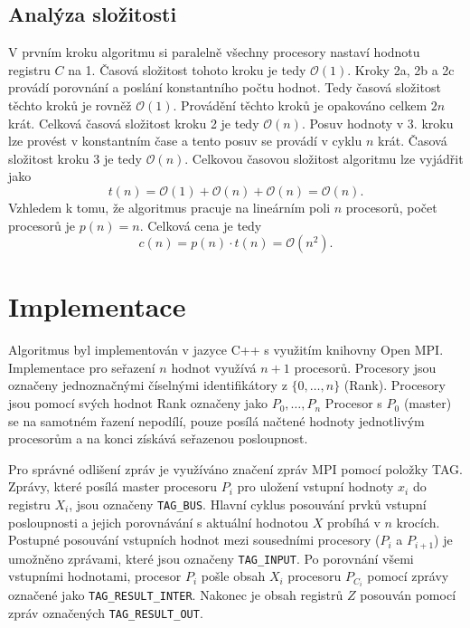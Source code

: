 \documentclass[a4paper,12pt]{article}
\begin{document}
\subsection*{Analýza složitosti}
V prvním kroku algoritmu si paralelně všechny procesory nastaví hodnotu registru $C$ na 1. Časová složitost 
tohoto kroku je tedy $\mathcal{O}(1)$. Kroky 2a, 2b a 2c provádí porovnání a poslání konstantního 
počtu hodnot. Tedy časová složitost těchto kroků je rovněž $\mathcal{O}(1)$. Provádění těchto kroků 
je opakováno celkem $2n$ krát. Celková časová složitost kroku 2 je tedy $\mathcal{O}(n)$. Posuv hodnoty v 3. 
kroku lze provést v konstantním čase a tento posuv se provádí v cyklu $n$ krát. Časová složitost kroku 
3 je tedy $\mathcal{O}(n)$. Celkovou časovou složitost algoritmu lze vyjádřit jako
\begin{equation}
  t(n) = \mathcal{O}(1) + \mathcal{O}(n) + \mathcal{O}(n) = \mathcal{O}(n).
\end{equation}
Vzhledem k tomu, že algoritmus pracuje na lineárním poli $n$ procesorů, počet procesorů 
je $p(n) = n$. Celková cena je tedy
\begin{equation}
  c(n) = p(n)\cdot t(n) = \mathcal{O}(n^2).
\end{equation}

\section{Implementace}
Algoritmus byl implementován v jazyce C++ s využitím knihovny Open MPI. Implementace pro seřazení $n$ hodnot 
využívá $n+1$ procesorů. Procesory jsou označeny jednoznačnými číselnými identifikátory z $\{0,\dots,n\}$ 
(Rank). Procesory jsou pomocí svých hodnot Rank označeny jako $P_0, \dots, P_n$ Procesor s $P_0$ (master) se na samotném řazení 
nepodílí, pouze posílá načtené hodnoty jednotlivým procesorům a na konci získává seřazenou posloupnost.

Pro správné odlišení zpráv je využíváno značení zpráv MPI pomocí položky TAG. Zprávy, které posílá master procesoru $P_i$ pro 
uložení vstupní hodnoty $x_i$ do registru $X_i$, jsou označeny \texttt{TAG\_BUS}. 
Hlavní cyklus posouvání prvků vstupní posloupnosti a jejich porovnávání s aktuální hodnotou $X$ probíhá v 
$n$ krocích. Postupné posouvání vstupních hodnot mezi sousedními procesory ($P_i$ a $P_{i+1}$) je umožněno 
zprávami, které jsou označeny \texttt{TAG\_INPUT}. Po porovnání všemi vstupními hodnotami, procesor $P_i$
pošle obsah $X_i$ procesoru $P_{C_i}$ pomocí zprávy označené jako \texttt{TAG\_RESULT\_INTER}. Nakonec je 
obsah registrů $Z$ posouván pomocí zpráv označených \texttt{TAG\_RESULT\_OUT}.
\end{document}
